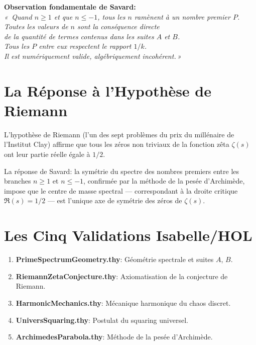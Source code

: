 \documentclass[12pt,a4paper]{article}
\begin{document}
\begin{center}
\large\textbf{Observation fondamentale de Savard:}\\[0.5em]
\textit{«\, Quand $n \geq 1$ et que $n \leq -1$, tous les $n$ ramènent à un nombre premier $P$.}\\
\textit{Toutes les valeurs de $n$ sont la conséquence directe}\\
\textit{de la quantité de termes contenus dans les suites $A$ et $B$.}\\
\textit{Tous les $P$ entre eux respectent le rapport $1/k$.}\\
\textit{Il est numériquement valide, algébriquement incohérent.\,»}
\end{center}

\section{La Réponse à l'Hypothèse de Riemann}

L'hypothèse de Riemann (l'un des sept problèmes du prix du millénaire de l'Institut Clay)
affirme que tous les zéros non triviaux de la fonction zêta $\zeta(s)$ ont leur partie
réelle égale à $1/2$.

La réponse de Savard: la symétrie du spectre des nombres premiers entre les branches
$n \geq 1$ et $n \leq -1$, confirmée par la méthode de la pesée d'Archimède, impose
que le centre de masse spectral — correspondant à la droite critique $\Re(s) = 1/2$ —
est l'unique axe de symétrie des zéros de $\zeta(s)$.

\section{Les Cinq Validations Isabelle/HOL}

\begin{enumerate}
  \item \textbf{PrimeSpectrumGeometry.thy}: Géométrie spectrale et suites $A$, $B$.
  \item \textbf{RiemannZetaConjecture.thy}: Axiomatisation de la conjecture de Riemann.
  \item \textbf{HarmonicMechanics.thy}: Mécanique harmonique du chaos discret.
  \item \textbf{UniversSquaring.thy}: Postulat du squaring universel.
  \item \textbf{ArchimedesParabola.thy}: Méthode de la pesée d'Archimède.
\end{enumerate}
\end{document}
